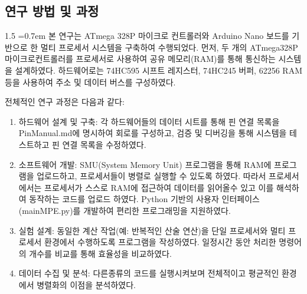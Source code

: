 \documentclass[a4paper, 12pt]{article}
\begin{document}
\subsection{연구 방법 및 과정}
\begin{spacing}{1.5}
\font=0.7em
본 연구는 ATmega 328P 마이크로 컨트롤러와 Arduino Nano 보드를 기반으로 한 멀티 프로세서 시스템을 구축하여 수행되었다. 먼저, 두 개의 ATmega328P 마이크로컨트롤러를 프로세서로 사용하여 공유 메모리(RAM)를 통해 통신하는 시스템을 설계하였다. 하드웨어로는 74HC595 시프트 레지스터, 74HC245 버퍼, 62256 RAM 등을 사용하여 주소 및 데이터 버스를 구성하였다.

전체적인 연구 과정은 다음과 같다:
\begin{enumerate}
    \item {하드웨어 설계 및 구축:} 각 하드웨어들의 데이터 시트를 통해 핀 연결 목록을 PinManual.md에 명시하여 회로를 구성하고, 검증 및 디버깅을 통해 시스템을 테스트하고 핀 연결 목록을 수정하였다.
    \item {소프트웨어 개발:} SMU(System Memory Unit) 프로그램을 통해 RAM에 프로그램을 업로드하고, 프로세서들이 병렬로 실행할 수 있도록 하였다. 따라서 프로세서에서는 프로세서가 스스로 RAM에 접근하여 데이터를 읽어올수 있고 이를 해석하여 동작하는 코드를 업로드 하였다. Python 기반의 사용자 인터페이스(mainMPE.py)를 개발하여 편리한 프로그래밍을 지원하였다.
    \item {실험 설계:} 동일한 계산 작업(예: 반복적인 산술 연산)을 단일 프로세서와 멀티 프로세서 환경에서 수행하도록 프로그램을 작성하였다. 일정시간 동안 처리한 명령어의 개수를 비교를 통해 효율성을 비교하였다.
    \item {데이터 수집 및 분석:} 다른종류의 코드를 실행시켜보며 전체적이고 평균적인 환경에서 병렬화의 이점을 분석하였다.
\end{enumerate}
\end{spacing}
\end{document}
